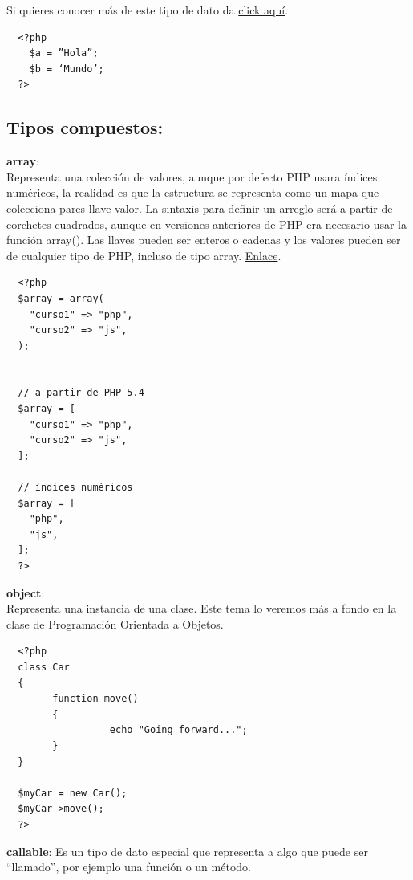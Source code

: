 \documentclass{article}
\begin{document}
Si quieres conocer más de este tipo de dato da
\href{http://php.net/manual/es/language.types.string.php#language.types.string.details}{click
aquí}.\\

\begin{verbatim}
  <?php
    $a = ”Hola”; 
    $b = ‘Mundo’; 
  ?>
\end{verbatim}

\subsection*{Tipos compuestos:}%
\textbf{array}:\\
Representa una colección de valores, aunque por defecto PHP usara índices
numéricos, la realidad es que la estructura se representa como un mapa que
colecciona pares llave-valor. La sintaxis para definir un arreglo será a partir
de corchetes cuadrados, aunque en versiones anteriores de PHP era necesario
usar la función array(). Las llaves pueden ser enteros o cadenas y los valores
pueden ser de cualquier tipo de PHP, incluso de tipo array.
\href{http://php.net/manual/es/language.types.array.php}{Enlace}.\\

\begin{verbatim}
  <?php
  $array = array(
    "curso1" => "php",
    "curso2" => "js",
  );


  // a partir de PHP 5.4
  $array = [
    "curso1" => "php",
    "curso2" => "js",
  ];

  // índices numéricos
  $array = [
    "php",
    "js",
  ];
  ?>
\end{verbatim}

\textbf{object}:\\
Representa una instancia de una clase. Este tema lo veremos más a fondo en la
clase de Programación Orientada a Objetos.\\

\begin{verbatim}
  <?php
  class Car
  {
        function move()
        {
                  echo "Going forward..."; 
        }
  }

  $myCar = new Car();
  $myCar->move();
  ?>
\end{verbatim}

\newpage

\textbf{callable}:
Es un tipo de dato especial que representa a algo que puede ser “llamado”, por
ejemplo una función o un método.\\
\end{document}
